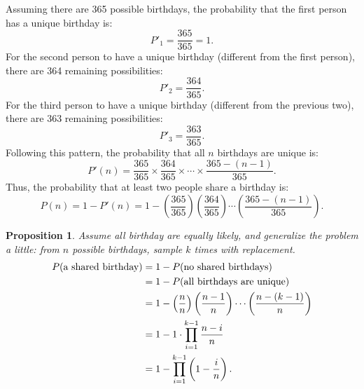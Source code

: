 \documentclass[12pt,openany]{book}
\newtheorem{proposition}[theorem]{Proposition}
\theoremstyle{definition}
\newcommand{\of}[1]{\left( #1 \right)}
\begin{document}
	\newpage
	Assuming there are 365 possible birthdays, the probability that the first person has a unique birthday is:
	\begin{equation*}
	P'_1 = \frac{365}{365} = 1.
	\end{equation*}
	For the second person to have a unique birthday (different from the first person), there are 364 remaining possibilities:
	\begin{equation*}
	P'_2 = \frac{364}{365}.
	\end{equation*}
	For the third person to have a unique birthday (different from the previous two), there are 363 remaining possibilities:
	\begin{equation*}
	P'_3 = \frac{363}{365}.
	\end{equation*}
	Following this pattern, the probability that all $n$ birthdays are unique is:
	\begin{equation*}
	P'(n) = \frac{365}{365} \times \frac{364}{365} \times \cdots \times \frac{365 - (n - 1)}{365}.
	\end{equation*}
	Thus, the probability that at least two people share a birthday is:
	\begin{equation*}
	P(n) = 1 - P'(n)=1-\of{\frac{365}{365}}\of{\frac{364}{365}}\cdots\of{\frac{365-(n-1)}{365}}.
	\end{equation*}
	\vspace{8pt}
	\begin{tcolorbox}[colback=white,colframe=procolor,arc=5pt,title={\color{white}\bf Generalization of Birthday Problem}]
		\begin{proposition}
			Assume all birthday are equally likely, and generalize the problem a little: \textnormal{from $n$ possible birthdays, sample $k$ times with replacement}. \begin{align*}
			P(\textnormal{a shared birthday})&=1-P(\textnormal{no shared birthdays})\\
			&=1-P(\textnormal{all birthdays are unique})\\
			&=1-\of{\frac{n}{n}}\of{\frac{n-1}{n}}\cdots\of{\frac{n-(k-1)}{n}}\\
			&=1-1\cdot \prod_{i=1}^{k-1}\frac{n-i}{n}\\
			&=1-\prod_{i=1}^{k-1}\of{1-\frac{i}{n}}.
			\end{align*}
		\end{proposition}
	\end{tcolorbox}
	
\end{document}
